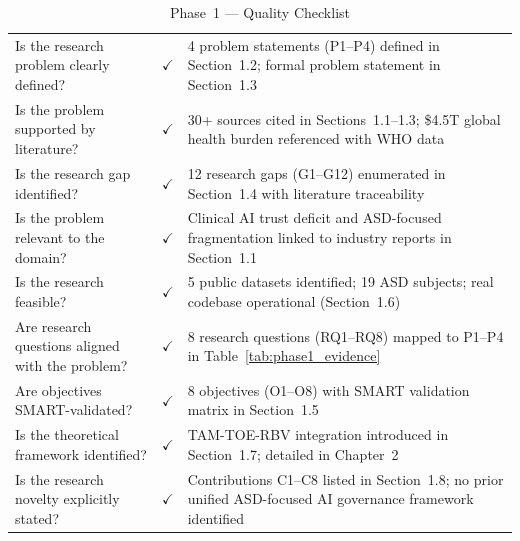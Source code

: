 \begingroup\singlespacing\tablefontsize\tablestripes
\begin{xltabular}{\textwidth}{@{} p{0.36\textwidth} >{\centering\arraybackslash}p{0.08\textwidth} p{0.48\textwidth} @{}}
\caption{Phase~1 --- Quality Checklist}
\label{tab:phase1_checklist}\\
\toprule
{} &  &  \\
\midrule
\endfirsthead
\endhead
\bottomrule
\endlastfoot
Is the research problem clearly defined?                 & $\checkmark$ & 4 problem statements (P1--P4) defined in Section~1.2; formal problem statement in Section~1.3 \\
\addlinespace
Is the problem supported by literature?                  & $\checkmark$ & 30+ sources cited in Sections~1.1--1.3; \$4.5T global health burden referenced with WHO data \\
\addlinespace
Is the research gap identified?                          & $\checkmark$ & 12 research gaps (G1--G12) enumerated in Section~1.4 with literature traceability \\
\addlinespace
Is the problem relevant to the domain?                   & $\checkmark$ & Clinical AI trust deficit and ASD-focused fragmentation linked to industry reports in Section~1.1 \\
\addlinespace
Is the research feasible?                                & $\checkmark$ & 5 public datasets identified; 19 ASD subjects; real codebase operational (Section~1.6) \\
\addlinespace
Are research questions aligned with the problem?         & $\checkmark$ & 8 research questions (RQ1--RQ8) mapped to P1--P4 in Table~\ref{tab:phase1_evidence} \\
\addlinespace
Are objectives SMART-validated?                          & $\checkmark$ & 8 objectives (O1--O8) with SMART validation matrix in Section~1.5 \\
\addlinespace
Is the theoretical framework identified?                 & $\checkmark$ & TAM-TOE-RBV integration introduced in Section~1.7; detailed in Chapter~2 \\
\addlinespace
Is the research novelty explicitly stated?               & $\checkmark$ & Contributions C1--C8 listed in Section~1.8; no prior unified ASD-focused AI governance framework identified \\
\end{xltabular}
\endgroup

\clearpage
